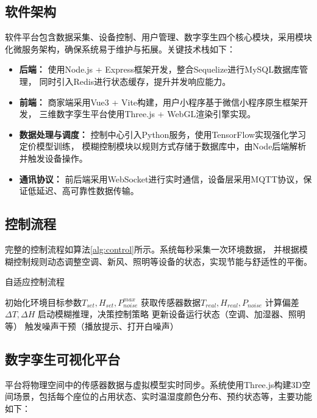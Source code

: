 \documentclass[12pt,a4paper]{IEEEtran} %
\begin{document}
\subsection{软件架构}
软件平台包含数据采集、设备控制、用户管理、数字孪生四个核心模块，采用模块化微服务架构，确保系统易于维护与拓展。关键技术栈如下：

\begin{itemize}
  \item \textbf{后端：} 使用Node.js + Express框架开发，整合Sequelize进行MySQL数据库管理，
        同时引入Redis进行状态缓存，提升并发响应能力。

  \item \textbf{前端：} 商家端采用Vue3 + Vite构建，用户小程序基于微信小程序原生框架开发，
        三维数字孪生平台使用Three.js + WebGL渲染引擎实现。

  \item \textbf{数据处理与调度：} 控制中心引入Python服务，使用TensorFlow实现强化学习定价模型训练，
        模糊控制模块以规则方式存储于数据库中，由Node后端解析并触发设备操作。

  \item \textbf{通讯协议：} 前后端采用WebSocket进行实时通信，设备层采用MQTT协议，保证低延迟、高可靠性数据传输。
\end{itemize}

\subsection{控制流程}
完整的控制流程如算法\ref{alg:control}所示。系统每秒采集一次环境数据，
并根据模糊控制规则动态调整空调、新风、照明等设备的状态，实现节能与舒适性的平衡。

\begin{algorithm}[htbp]
  \caption{自适应控制流程}
  \label{alg:control}
  \begin{algorithmic}[1]
    \State 初始化环境目标参数$T_{set}, H_{set}, P_{noise}^{max}$
    \State 获取传感器数据$T_{real}, H_{real}, P_{noise}$
    \State 计算偏差$\Delta T, \Delta H$
    \State 启动模糊推理，决策控制策略
    \State 更新设备运行状态（空调、加湿器、照明等）
    \EndIf
    \State 触发噪声干预（播放提示、打开白噪声）
    \EndIf
    \EndWhile
  \end{algorithmic}
\end{algorithm}

\subsection{数字孪生可视化平台}
平台将物理空间中的传感器数据与虚拟模型实时同步。系统使用Three.js构建3D空间场景，包括每个座位的占用状态、实时温湿度颜色分布、预约状态等，主要功能如下：
\end{document}
